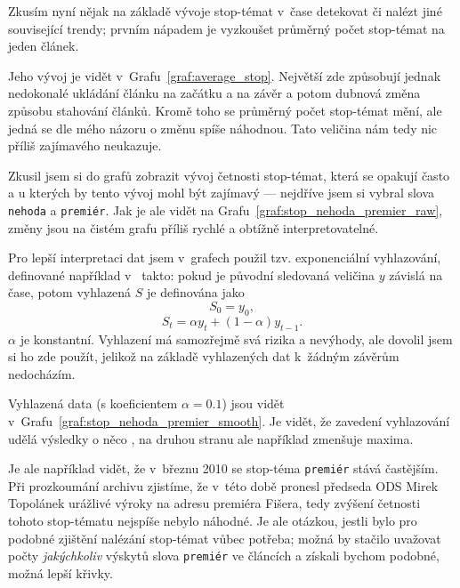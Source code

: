 \documentclass[12pt,a4paper]{report}
\begin{document}
Zkusím nyní nějak na základě vývoje stop-témat v~čase detekovat  či nalézt jiné související trendy; prvním nápadem je vyzkoušet průměrný počet stop-témat na jeden článek.


Jeho vývoj je vidět v~Grafu~\ref{graf:average_stop}. Největší  zde způsobují jednak nedokonalé ukládání článku na začátku a na závěr a potom dubnová změna způsobu stahování článků. Kromě toho se průměrný počet stop-témat mění, ale jedná se dle mého názoru o změnu spíše náhodnou. Tato veličina nám tedy nic příliš zajímavého neukazuje.



Zkusil jsem si do grafů zobrazit vývoj četnosti stop-témat, která se opakují často a u kterých by tento vývoj mohl být zajímavý --- nejdříve jsem si vybral slova \texttt{nehoda} a \texttt{premiér}. Jak je ale vidět na Grafu~\ref{graf:stop_nehoda_premier_raw}, změny jsou na čistém grafu příliš rychlé a obtížně interpretovatelné.



Pro lepší interpretaci dat jsem v~grafech použil tzv. exponenciální vyhlazování, definované například v~\cite{nist} takto: pokud je původní sledovaná veličina $y$ závislá na čase, potom vyhlazená $S$ je definována jako $$S_0=y_0,$$ $$S_t=\alpha y_t+(1-\alpha)y_{t-1}.$$ $\alpha$ je konstantní. Vyhlazení má samozřejmě svá rizika a nevýhody, ale dovolil jsem si ho zde použít, jelikož na základě vyhlazených dat k~žádným  závěrům nedocházím.


Vyhlazená data (s koeficientem $\alpha=0.1$) jsou vidět v~Grafu~\ref{graf:stop_nehoda_premier_smooth}. Je vidět, že zavedení vyhlazování udělá výsledky o něco , na druhou stranu ale například zmenšuje maxima.

Je ale například vidět, že v~březnu 2010 se stop-téma \texttt{premiér} stává častějším. Při prozkoumání archivu zjistíme, že v~této době pronesl předseda ODS Mirek Topolánek urážlivé výroky na adresu premiéra Fišera, tedy zvýšení četnosti tohoto stop-tématu nejspíše nebylo náhodné. Je ale otázkou, jestli bylo pro podobné zjištění nalézání stop-témat vůbec potřeba; možná by stačilo uvažovat počty \emph{jakýchkoliv} výskytů slova \texttt{premiér} ve článcích a získali bychom podobné, možná lepší křivky.
\end{document}
